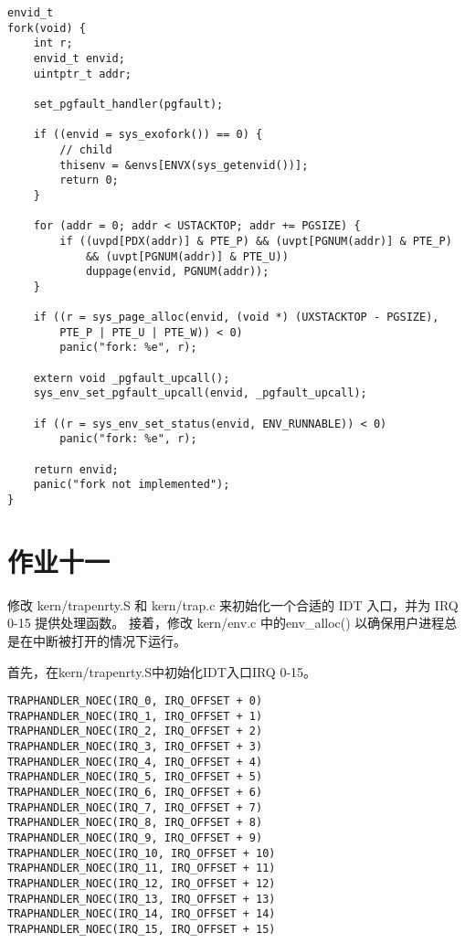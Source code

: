 \documentclass[12pt,a4paper]{article}
\begin{document}
\begin{lstlisting}[style=CPP]
envid_t
fork(void) {
    int r;
    envid_t envid;
    uintptr_t addr;

    set_pgfault_handler(pgfault);

    if ((envid = sys_exofork()) == 0) {
        // child
        thisenv = &envs[ENVX(sys_getenvid())];
        return 0;
    }

    for (addr = 0; addr < USTACKTOP; addr += PGSIZE) {
        if ((uvpd[PDX(addr)] & PTE_P) && (uvpt[PGNUM(addr)] & PTE_P)
            && (uvpt[PGNUM(addr)] & PTE_U))
            duppage(envid, PGNUM(addr));
    }

    if ((r = sys_page_alloc(envid, (void *) (UXSTACKTOP - PGSIZE), 
        PTE_P | PTE_U | PTE_W)) < 0)
        panic("fork: %e", r);

    extern void _pgfault_upcall();
    sys_env_set_pgfault_upcall(envid, _pgfault_upcall);

    if ((r = sys_env_set_status(envid, ENV_RUNNABLE)) < 0)
        panic("fork: %e", r);

    return envid;
    panic("fork not implemented");
}
\end{lstlisting}

\section{作业十一}

修改 kern/trapenrty.S 和 kern/trap.c 来初始化一个合适的 IDT 入口，并为 IRQ 0-15 提供处理函数。
接着，修改 kern/env.c 中的env\_alloc() 以确保用户进程总是在中断被打开的情况下运行。

首先，在kern/trapenrty.S中初始化IDT入口IRQ 0-15。
\begin{lstlisting}[style=CPP]
TRAPHANDLER_NOEC(IRQ_0, IRQ_OFFSET + 0)
TRAPHANDLER_NOEC(IRQ_1, IRQ_OFFSET + 1)
TRAPHANDLER_NOEC(IRQ_2, IRQ_OFFSET + 2)
TRAPHANDLER_NOEC(IRQ_3, IRQ_OFFSET + 3)
TRAPHANDLER_NOEC(IRQ_4, IRQ_OFFSET + 4)
TRAPHANDLER_NOEC(IRQ_5, IRQ_OFFSET + 5)
TRAPHANDLER_NOEC(IRQ_6, IRQ_OFFSET + 6)
TRAPHANDLER_NOEC(IRQ_7, IRQ_OFFSET + 7)
TRAPHANDLER_NOEC(IRQ_8, IRQ_OFFSET + 8)
TRAPHANDLER_NOEC(IRQ_9, IRQ_OFFSET + 9)
TRAPHANDLER_NOEC(IRQ_10, IRQ_OFFSET + 10)
TRAPHANDLER_NOEC(IRQ_11, IRQ_OFFSET + 11)
TRAPHANDLER_NOEC(IRQ_12, IRQ_OFFSET + 12)
TRAPHANDLER_NOEC(IRQ_13, IRQ_OFFSET + 13)
TRAPHANDLER_NOEC(IRQ_14, IRQ_OFFSET + 14)
TRAPHANDLER_NOEC(IRQ_15, IRQ_OFFSET + 15)
\end{lstlisting}
\end{document}
